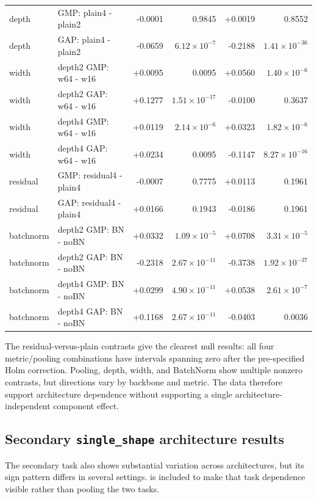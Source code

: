 {\begin{longtable}{p{.10\linewidth}p{.38\linewidth}rrrr}
depth & GMP: plain4 - plain2 & -0.0001 & 0.9845 & +0.0019 & 0.8552 \\
depth & GAP: plain4 - plain2 & -0.0659 & $6.12\times10^{-7}$ & -0.2188 & $1.41\times10^{-36}$ \\
width & depth2 GMP: w64 - w16 & +0.0095 & 0.0095 & +0.0560 & $1.40\times10^{-6}$ \\
width & depth2 GAP: w64 - w16 & +0.1277 & $1.51\times10^{-17}$ & -0.0100 & 0.3637 \\
width & depth4 GMP: w64 - w16 & +0.0119 & $2.14\times10^{-6}$ & +0.0323 & $1.82\times10^{-6}$ \\
width & depth4 GAP: w64 - w16 & +0.0234 & 0.0095 & -0.1147 & $8.27\times10^{-16}$ \\
residual & GMP: residual4 - plain4 & -0.0007 & 0.7775 & +0.0113 & 0.1961 \\
residual & GAP: residual4 - plain4 & +0.0166 & 0.1943 & -0.0186 & 0.1961 \\
batchnorm & depth2 GMP: BN - noBN & +0.0332 & $1.09\times10^{-5}$ & +0.0708 & $3.31\times10^{-5}$ \\
batchnorm & depth2 GAP: BN - noBN & -0.2318 & $2.67\times10^{-11}$ & -0.3738 & $1.92\times10^{-37}$ \\
batchnorm & depth4 GMP: BN - noBN & +0.0299 & $4.90\times10^{-11}$ & +0.0538 & $2.61\times10^{-7}$ \\
batchnorm & depth4 GAP: BN - noBN & +0.1168 & $2.67\times10^{-11}$ & -0.0403 & 0.0036 \\
\end{longtable}
\normalsize
}

The residual-versus-plain contrasts give the clearest null results: all four metric/pooling combinations have intervals spanning zero after the pre-specified Holm correction. Pooling, depth, width, and BatchNorm show multiple nonzero contrasts, but directions vary by backbone and metric. The data therefore support architecture dependence without supporting a single architecture-independent component effect.

\subsection{Secondary \texttt{single\_shape} architecture results}\label{app:architecture-single}

The secondary task also shows substantial variation across architectures, but its sign pattern differs in several settings.  is included to make that task dependence visible rather than pooling the two tasks.


